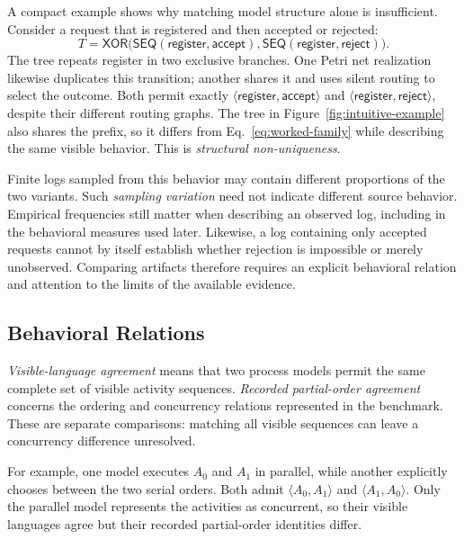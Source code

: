 \documentclass[mathematics,article,submit,moreauthors]{Definitions/mdpi}
\begin{document}
A compact example shows why matching model structure alone is insufficient. Consider a request that is registered and then accepted or rejected:
\begin{equation}
T=\mathsf{XOR}\bigl(
  \mathsf{SEQ}(\textsf{register},\textsf{accept}),
  \mathsf{SEQ}(\textsf{register},\textsf{reject})
\bigr).
\label{eq:worked-family}
\end{equation}
The tree repeats \textsf{register} in two exclusive branches. One Petri net realization likewise duplicates this transition; another shares it and uses silent routing to select the outcome. Both permit exactly $\langle\textsf{register},\textsf{accept}\rangle$ and $\langle\textsf{register},\textsf{reject}\rangle$, despite their different routing graphs. The tree in Figure~\ref{fig:intuitive-example} also shares the prefix, so it differs from Eq.~\eqref{eq:worked-family} while describing the same visible behavior. This is \emph{structural non-uniqueness}.

Finite logs sampled from this behavior may contain different proportions of the two variants. Such \emph{sampling variation} need not indicate different source behavior. Empirical frequencies still matter when describing an observed log, including in the behavioral measures used later. Likewise, a log containing only accepted requests cannot by itself establish whether rejection is impossible or merely unobserved. Comparing artifacts therefore requires an explicit behavioral relation and attention to the limits of the available evidence.

\subsection{Behavioral Relations}

\emph{Visible-language agreement} means that two process models permit the same complete set of visible activity sequences. \emph{Recorded partial-order agreement} concerns the ordering and concurrency relations represented in the benchmark. These are separate comparisons: matching all visible sequences can leave a concurrency difference unresolved.

For example, one model executes $A_0$ and $A_1$ in parallel, while another explicitly chooses between the two serial orders. Both admit $\langle A_0,A_1\rangle$ and $\langle A_1,A_0\rangle$. Only the parallel model represents the activities as concurrent, so their visible languages agree but their recorded partial-order identities differ.
\end{document}
